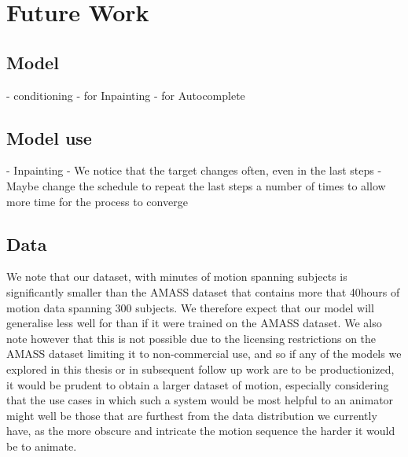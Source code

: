 \section{Future Work}
\label{sec:future_work}

\subsection{Model}
- conditioning
    - for Inpainting
    - for Autocomplete



\subsection{Model use}
- Inpainting
    - We notice that the target changes often, even in the last steps
    - Maybe change the schedule to repeat the last steps a number of times to allow more time for the process to converge



\subsection{Data}
We note that our dataset, with  minutes of motion spanning  subjects is significantly smaller than the AMASS \cite{amass} dataset that contains more that 40hours of motion data spanning 300 subjects. We therefore expect that our model will generalise less well for than if it were trained on the AMASS dataset. We also note however that this is not possible due to the licensing restrictions on the AMASS dataset limiting it to non-commercial use, and so if any of the models we explored in this thesis or in subsequent follow up work are to be productionized, it would be prudent to obtain a larger dataset of motion, especially considering that the use cases in which such a system would be most helpful to an animator might well be those that are furthest from the data distribution we currently have, as the more obscure and intricate the motion sequence the harder it would be to animate.